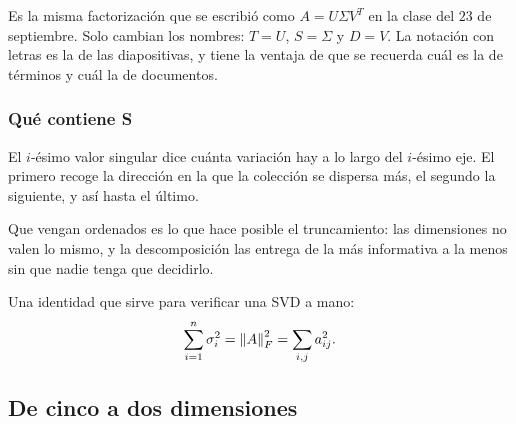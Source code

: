 \documentclass[11pt,letterpaper]{article}
\begin{document}
\begin{observacion}
    Es la misma factorización que se escribió como
    $A = U \Sigma V^{T}$ en la clase del $23$ de septiembre. Solo
    cambian los nombres: $T = U$, $S = \Sigma$ y $D = V$. La notación
    con letras es la de las diapositivas, y tiene la ventaja de que se
    recuerda cuál es la de términos y cuál la de documentos.
\end{observacion}

\subsubsection*{Qué contiene S}

El $i$-ésimo valor singular dice cuánta variación hay a lo largo del
$i$-ésimo eje. El primero recoge la dirección en la que la colección
se dispersa más, el segundo la siguiente, y así hasta el último.

Que vengan ordenados es lo que hace posible el truncamiento: las
dimensiones no valen lo mismo, y la descomposición las entrega de la
más informativa a la menos sin que nadie tenga que decidirlo.

Una identidad que sirve para verificar una SVD a mano:
\[
    \sum_{i=1}^{n} \sigma_i^2 = \left\lVert A \right\rVert_F^2 = \sum_{i,j} a_{ij}^2 .
\]

\subsection*{De cinco a dos dimensiones}
\end{document}
